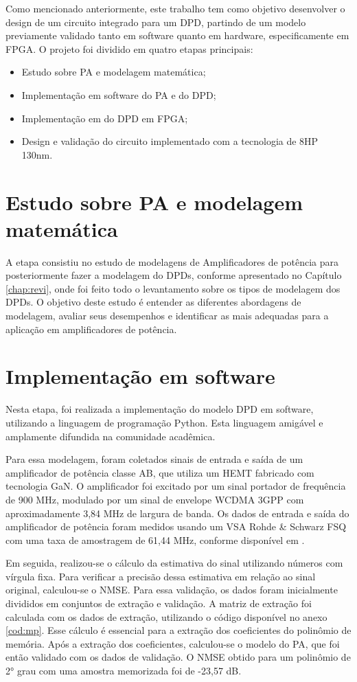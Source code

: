 Como mencionado anteriormente, este trabalho tem como objetivo desenvolver o design de um circuito integrado para um DPD, partindo de um modelo previamente validado tanto em software quanto em hardware, especificamente em FPGA. O projeto foi dividido em quatro etapas principais:

\begin{itemize}
\item Estudo sobre PA e modelagem matemática;
\item Implementação em software do PA e do DPD;
\item Implementação em do DPD em FPGA;
\item Design e validação do circuito implementado com a tecnologia de 8HP 130nm.
\end{itemize}


\section{Estudo sobre PA e modelagem matemática}
A etapa consistiu no estudo de modelagens de Amplificadores de potência para posteriormente fazer a modelagem do DPDs, conforme apresentado no Capítulo \ref{chap:revi}, onde foi feito todo o levantamento sobre os tipos de modelagem dos DPDs. O objetivo deste estudo é entender as diferentes abordagens de modelagem, avaliar seus desempenhos e identificar as mais adequadas para a aplicação em amplificadores de potência.

\section{Implementação em software} \label{sec:implsoft}

Nesta etapa, foi realizada a implementação do modelo DPD em software, utilizando a linguagem de programação Python. Esta linguagem amigável e amplamente difundida na comunidade acadêmica.

Para essa modelagem, foram coletados sinais de entrada e saída de um amplificador de potência classe AB, que utiliza um HEMT fabricado com tecnologia GaN. O amplificador foi excitado por um sinal portador de frequência de 900 MHz, modulado por um sinal de envelope WCDMA 3GPP com aproximadamente 3,84 MHz de largura de banda. Os dados de entrada e saída do amplificador de potência foram medidos usando um VSA Rohde \& Schwarz FSQ com uma taxa de amostragem de 61,44 MHz, conforme disponível em \cite{Bonfim2016}.

Em seguida, realizou-se o cálculo da estimativa do sinal utilizando números com vírgula fixa. Para verificar a precisão dessa estimativa em relação ao sinal original, calculou-se o NMSE. Para essa validação, os dados foram inicialmente divididos em conjuntos de extração e validação. A matriz de extração foi calculada com os dados de extração, utilizando o código disponível no anexo \ref{cod:mp}. Esse cálculo é essencial para a extração dos coeficientes do polinômio de memória. Após a extração dos coeficientes, calculou-se o modelo do PA, que foi então validado com os dados de validação. O NMSE obtido para um polinômio de 2° grau com uma amostra memorizada foi de -23,57 dB.

